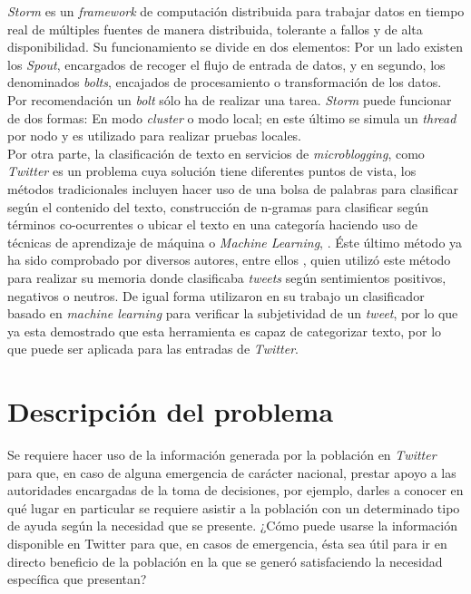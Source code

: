 \textit{Storm} es un \textit{framework} de computación distribuida para trabajar datos en tiempo real de múltiples fuentes de manera distribuida, tolerante a fallos y de alta disponibilidad. Su funcionamiento se divide en dos elementos: Por un lado existen los \textit{Spout}, encargados de recoger el flujo de entrada de datos, y en segundo, los denominados \textit{bolts}, encajados de procesamiento o transformación de los datos. Por recomendación un \textit{bolt} sólo ha de realizar una tarea. \textit{Storm} puede funcionar de dos formas: En modo \textit{cluster} o modo local; en este último se simula un \textit{thread} por nodo y es utilizado para realizar pruebas locales.\\

Por otra parte, la clasificación de texto en servicios de \textit{microblogging}, como \textit{Twitter} es un problema cuya solución tiene diferentes puntos de vista, los métodos tradicionales incluyen hacer uso de una bolsa de palabras para clasificar según el contenido del texto, construcción de n-gramas para clasificar según términos co-ocurrentes o ubicar el texto en una categoría haciendo uso de técnicas de aprendizaje de máquina o \textit{Machine Learning}, \cite{EventDetection}. Éste último método ya ha sido comprobado por diversos autores, entre ellos \cite{Maldonado}, quien utilizó este método para realizar su memoria donde clasificaba \textit{tweets} según sentimientos positivos, negativos o neutros. De igual forma \cite{WladdimiroPMI} utilizaron en su trabajo un clasificador basado en \textit{machine learning} para verificar la subjetividad de un \textit{tweet}, por lo que ya esta demostrado que esta herramienta es capaz de categorizar texto, por lo que puede ser aplicada para las entradas de \textit{Twitter}.

	
\section{Descripción del problema}
\label{intro:problema}

Se requiere hacer uso de la información generada por la población en \textit{Twitter} para que, en caso de alguna emergencia de carácter nacional, prestar apoyo a las autoridades encargadas de la toma de decisiones, por ejemplo, darles a conocer en qué lugar en particular se requiere asistir a la población con un determinado tipo de ayuda según la necesidad que se presente. ¿Cómo puede usarse la información disponible en Twitter para que, en casos de emergencia, ésta sea útil para ir en directo beneficio de la población en la que se generó satisfaciendo la necesidad específica que presentan?

